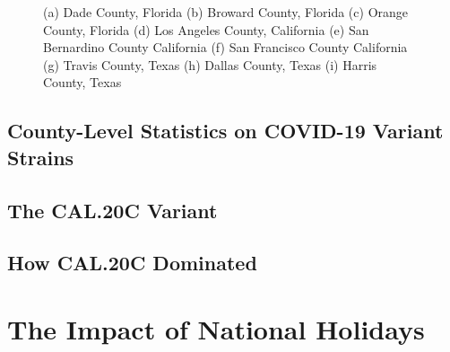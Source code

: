 \documentclass[]{article}
\begin{document}
\begin{figure}
	\caption{(a) Dade County, Florida (b) Broward County, Florida (c) Orange County, Florida (d) Los Angeles County, California (e) San Bernardino County California (f) San Francisco County California (g) Travis County, Texas (h) Dallas County, Texas (i) Harris County, Texas}
	\label{fig:foobar}
\end{figure}

\FloatBarrier
\subsection{County-Level Statistics on COVID-19 Variant Strains}
\subsection{The CAL.20C Variant}
\subsection{How CAL.20C Dominated}

\FloatBarrier
\vspace{5mm}

\section{The Impact of National Holidays}
\end{document}
